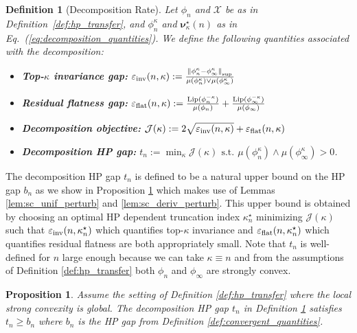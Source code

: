 \documentclass{article} %
\newtheorem{proposition}[theorem]{Proposition}
\newtheorem{definition}{Definition}
\newcommand{\bhp}{\bm{\nu}}                       %
\newcommand{\searchspace}{\mathcal{X}}            %
\newcommand{\hptrunc}{\kappa}
\newcommand{\supnorm}[1]{\norm{#1}_{\mathrm{sup}}}
\newcommand{\epsinv}{\eps_{\mathrm{inv}}}
\newcommand{\epsflat}{\eps_{\mathrm{flat}}}
\newcommand{\Lip}{\mathrm{Lip}}
\newcommand{\decompobj}{\mathcal{J}}
\begin{document}
\begin{definition}[Decomposition Rate]\label{def:decomposition_rate}
Let $\phi_n$ and $\searchspace$ be as in Definition~\ref{def:hp_transfer}, and $\phi_n^\hptrunc$ and $\bhp^\star_\hptrunc(n)$ as in Eq.\ (\ref{eq:decomposition_quantities}). We define the following quantities associated with the decomposition:
\begin{itemize}
    \item \textbf{Top-$\hptrunc$ invariance gap:} $ \epsinv(n, \hptrunc) := \frac{\supnorm{\phi_n^\hptrunc - \phi_\infty^\hptrunc}}{\mu(\phi_n^\hptrunc) \vee \mu(\phi_\infty^\hptrunc)}$

    \item \textbf{Residual flatness gap:} $ \epsflat(n, \hptrunc) := \frac{\Lip(\phi_n^{-\hptrunc})}{\mu(\phi_n)} + \frac{\Lip(\phi_\infty^{-\hptrunc})}{\mu(\phi_\infty)}$

    \item \textbf{Decomposition objective:} $\decompobj(\hptrunc) := 2 \sqrt{\epsinv(n, \hptrunc) } + \epsflat(n, \hptrunc)$
    
    \item \textbf{Decomposition HP gap:}  $ t_n := \min_{\hptrunc} \decompobj(\hptrunc)$ $\mathrm{s.t.}$ $\mu(\phi_n^\hptrunc) \wedge \mu(\phi_\infty^\hptrunc) > 0$.
\end{itemize}
\end{definition}
The decomposition HP gap $t_n$ is defined to be a natural upper bound on the HP gap $b_n$ as we show in Proposition \ref{prop:fast_transfer} which makes use of Lemmas \ref{lem:sc_unif_perturb} and \ref{lem:sc_deriv_perturb}. This upper bound is obtained by choosing an optimal HP dependent truncation index $\hptrunc^\star_n$ minimizing $\decompobj(\hptrunc)$ such that $\epsinv(n, \hptrunc^\star_n)$ which quantifies top-$\hptrunc$ invariance and $\epsflat(n, \hptrunc^\star_n)$ which quantifies residual flatness are both appropriately small. Note that $t_n$ is well-defined for $n$ large enough because we can take $\hptrunc \equiv n$ and from the assumptions of Definition \ref{def:hp_transfer} both $\phi_n$ and $\phi_\infty$ are strongly convex.
\begin{proposition}\label{prop:fast_transfer}
Assume the setting of Definition \ref{def:hp_transfer} where the local strong convexity is global. The decomposition HP gap $t_n$ in Definition \ref{def:decomposition_rate} satisfies $t_n \geq b_n$ where $b_n$ is the HP gap from Definition \ref{def:convergent_quantities}.
\end{proposition}
\end{document}
